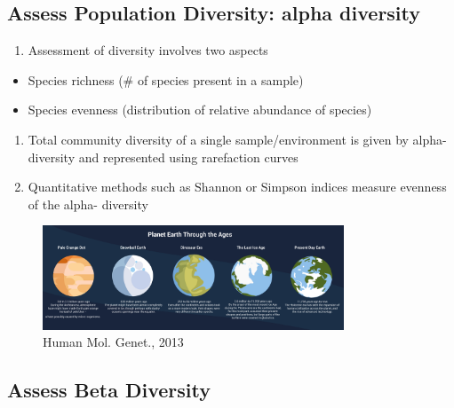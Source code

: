 \documentclass[
]{book}
\providecommand{\tightlist}{%
  \setlength{\itemsep}{0pt}\setlength{\parskip}{0pt}}
\begin{document}
\hypertarget{assess-population-diversity-alpha-diversity}{%
\subsection{\texorpdfstring{Assess Population Diversity: \textbf{alpha diversity}}{Assess Population Diversity: alpha diversity}}\label{assess-population-diversity-alpha-diversity}}

\begin{enumerate}
\def\labelenumi{\arabic{enumi}.}
\tightlist
\item
  Assessment of diversity involves two aspects
\end{enumerate}

\begin{itemize}
\tightlist
\item
  Species richness (\# of species present in a sample)
\item
  Species evenness (distribution of relative abundance of species)
\end{itemize}

\begin{enumerate}
\def\labelenumi{\arabic{enumi}.}
\setcounter{enumi}{1}
\item
  Total community diversity of a single sample/environment is given by alpha-diversity and represented using rarefaction curves
\item
  Quantitative methods such as Shannon or Simpson indices measure evenness of the alpha- diversity
\end{enumerate}

\begin{figure}
\centering
\includegraphics[width=0.8\textwidth,height=\textheight]{./Figures/Planets.png}
\caption{Human Mol. Genet., 2013}
\end{figure}

\hypertarget{assess-beta-diversity}{%
\subsection{Assess Beta Diversity}\label{assess-beta-diversity}}
\end{document}
